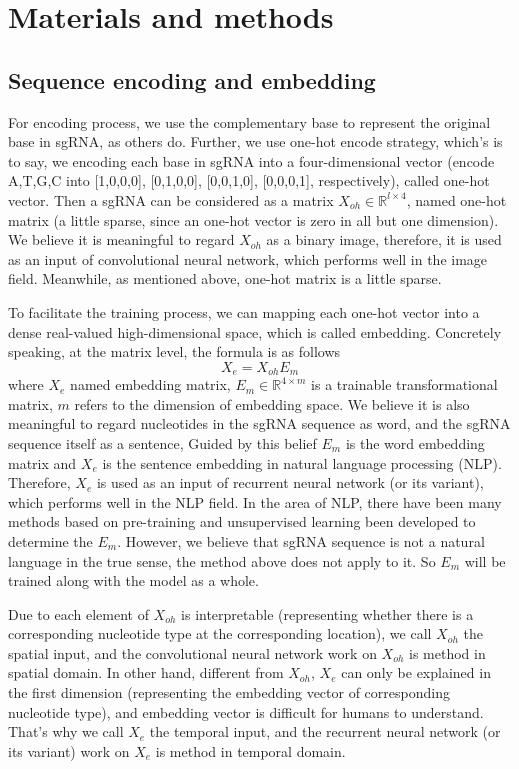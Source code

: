 \documentclass{bioinfo}
\begin{document}
\section{Materials and methods}

\subsection{Sequence encoding and embedding}

For encoding process, we use the complementary base to represent the original base in sgRNA, as others do. 
Further, we use one-hot encode strategy, which's is to say, we encoding each base in sgRNA into a four-dimensional vector 
(encode A,T,G,C into [1,0,0,0], [0,1,0,0], [0,0,1,0], [0,0,0,1], respectively), called one-hot vector. 
Then a sgRNA can be considered as a matrix $X_{oh}\in\mathbb{R}^{l\times4} $, named one-hot matrix (a little sparse, since an one-hot vector is zero in all but one dimension). 
We believe it is meaningful to regard $X_{oh}$ as a binary image, 
therefore, it is used as an input of convolutional neural network, which performs well in the image field.
Meanwhile, as mentioned above, one-hot matrix is a little sparse. 

To facilitate the training process, we can mapping each one-hot vector into a dense real-valued high-dimensional space, which is called embedding. 
Concretely speaking, at the matrix level, the formula is as follows
\begin{equation}
X_e=X_{oh}E_m\label{eq:08}
\end{equation}
where $X_e$ named embedding matrix, $E_m\in\mathbb{R}^{4\times m}$ is a trainable transformational matrix, $m$ refers to the dimension of embedding space. 
We believe it is also meaningful to regard nucleotides in the sgRNA sequence as word, and the sgRNA sequence itself as a sentence, 
Guided by this belief $E_m$ is the word embedding matrix and $X_e$ is the sentence embedding in natural language processing (NLP).
Therefore, $X_e$ is used as an input of recurrent neural network (or its variant), which performs well in the NLP field.
In the area of NLP, there have been many methods based on pre-training and unsupervised learning been developed to determine the $E_m$. 
However, we believe that sgRNA sequence is not a natural language in the true sense, the method above does not apply to it. 
So $E_m$ will be trained along with the model as a whole. 

Due to each element of $X_{oh}$ is interpretable (representing whether there is a corresponding nucleotide type at the corresponding location), 
we call $X_{oh}$ the spatial input, and the convolutional neural network work on $X_{oh}$ is method in spatial domain. 
In other hand, different from $X_{oh}$, $X_e$ can only be explained in the first dimension (representing the embedding vector of corresponding nucleotide type), 
and embedding vector is difficult for humans to understand. 
That's why we call $X_e$ the temporal input, and the recurrent neural network (or its variant) work on $X_e$ is method in temporal domain. 
\end{document}
